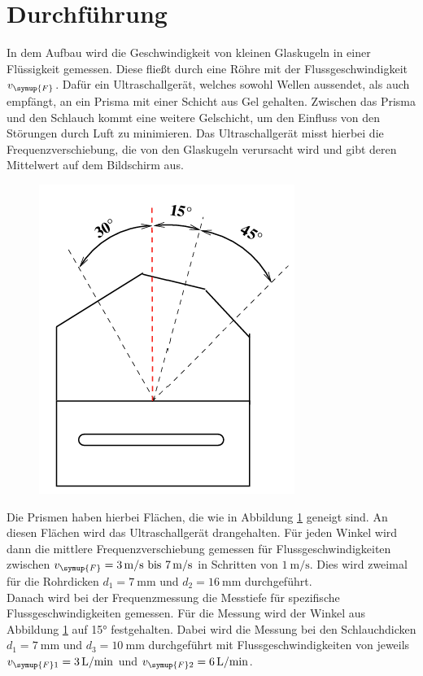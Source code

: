 \section{Durchführung}

    	In dem Aufbau wird die Geschwindigkeit von kleinen Glaskugeln in einer Flüssigkeit gemessen.
        Diese fließt durch eine Röhre mit der Flussgeschwindigkeit $v_{\symup{F}}$. Dafür ein
        Ultraschallgerät, welches sowohl Wellen aussendet, als auch empfängt, an ein Prisma mit
        einer Schicht aus Gel gehalten. Zwischen das Prisma und den Schlauch kommt eine weitere
        Gelschicht, um den Einfluss von den Störungen durch Luft zu minimieren. 
        Das Ultraschallgerät misst hierbei die Frequenzverschiebung, die von den Glaskugeln
        verursacht wird und gibt deren Mittelwert auf dem Bildschirm aus. \\

        \begin{figure}[H]
            \includegraphics{Bilder/winkel.png}
            \label{fig:winkel}       
        \end{figure}
        \noindent Die Prismen haben hierbei Flächen, die wie in Abbildung \ref{fig:winkel} geneigt sind.
        An diesen Flächen wird das Ultraschallgerät drangehalten. Für jeden Winkel wird dann die mittlere
        Frequenzverschiebung gemessen für Flussgeschwindigkeiten zwischen $v_{\symup{F}}=\qty{3}{\meter\per\second}\text{ bis }
        \qty{7}{\meter\per\second}$ in Schritten von $\qty{1}{\meter\per\second}$. Dies wird zweimal für die
        Rohrdicken $d_1=\qty{7}{\milli\meter}$ und $d_2=\qty{16}{\milli\meter}$ durchgeführt.\\
        \noindent Danach wird bei der Frequenzmessung die Messtiefe für spezifische Flussgeschwindigkeiten gemessen.
        Für die Messung wird der Winkel aus Abbildung \ref{fig:winkel} auf 15° festgehalten. Dabei wird die Messung
        bei den Schlauchdicken $d_1=\qty{7}{\milli\meter}$ und $d_3=\qty{10}{\milli\meter}$ durchgeführt mit 
        Flussgeschwindigkeiten von jeweils $v_{\symup{F}1}=\qty{3}{\liter\per\minute}$ und $v_{\symup{F}2}=\qty{6}{\liter\per\minute}$.
        
\label{sec:Durchführung}
